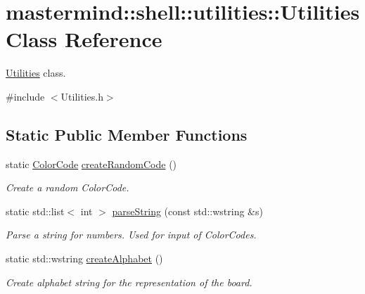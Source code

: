 \hypertarget{classmastermind_1_1shell_1_1utilities_1_1_utilities}{}\section{mastermind\+:\+:shell\+:\+:utilities\+:\+:Utilities Class Reference}
\label{classmastermind_1_1shell_1_1utilities_1_1_utilities}


\hyperlink{classmastermind_1_1shell_1_1utilities_1_1_utilities}{Utilities} class.  




{\ttfamily \#include $<$Utilities.\+h$>$}

\subsection*{Static Public Member Functions}
\begin{DoxyCompactItemize}
\item 
static \hyperlink{classmastermind_1_1logic_1_1_color_code}{Color\+Code} \hyperlink{classmastermind_1_1shell_1_1utilities_1_1_utilities_ae384c27ca0a2b6866d9769b60ebb011f}{create\+Random\+Code} ()
\begin{DoxyCompactList}\small\item\em Create a random Color\+Code. \end{DoxyCompactList}\item 
static std\+::list$<$ int $>$ \hyperlink{classmastermind_1_1shell_1_1utilities_1_1_utilities_a42b5ee02b8c69c290ab27e9f76a8dbb9}{parse\+String} (const std\+::wstring \&s)
\begin{DoxyCompactList}\small\item\em Parse a string for numbers. Used for input of Color\+Codes. \end{DoxyCompactList}\item 
static std\+::wstring \hyperlink{classmastermind_1_1shell_1_1utilities_1_1_utilities_a86393a0717a6c0522878b951bffa3cbc}{create\+Alphabet} ()
\begin{DoxyCompactList}\small\item\em Create alphabet string for the representation of the board. \end{DoxyCompactList}\end{DoxyCompactItemize}
